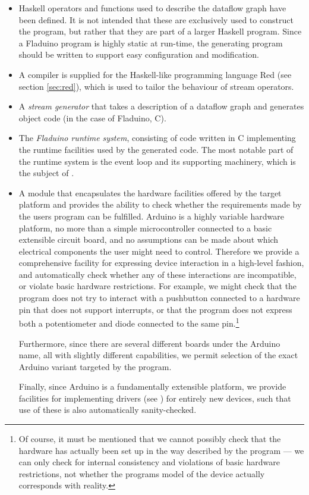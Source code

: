 \documentclass[a4paper, oneside, final]{memoir}
\let\fref\undefined
\let\Fref\undefined
\begin{document}
\begin{itemize}
\item Haskell operators and functions used to describe the dataflow
  graph have been defined.  It is not intended that these are
  exclusively used to construct the program, but rather that they are
  part of a larger Haskell program.  Since a Fladuino program is
  highly static at run-time, the generating program should be written
  to support easy configuration and modification.
\item A compiler is supplied for the Haskell-like programming language
  Red (see section \ref{sec:red}), which is used to tailor the
  behaviour of stream operators.
\item A \textit{stream generator} that takes a description of a
  dataflow graph and generates object code (in the case of Fladuino,
  C).
\item The \textit{Fladuino runtime system}, consisting of code written
  in C implementing the runtime facilities used by the generated code.
  The most notable part of the runtime system is the event loop and
  its supporting machinery, which is the subject of
  \Fref{sec:dataflowevaluationstrategy}.
\item A module that encapsulates the hardware facilities offered by
  the target platform and provides the ability to check whether the
  requirements made by the users program can be fulfilled.  Arduino is
  a highly variable hardware platform, no more than a simple
  microcontroller connected to a basic extensible circuit board, and
  no assumptions can be made about which electrical components the
  user might need to control.  Therefore we provide a comprehensive
  facility for expressing device interaction in a high-level fashion,
  and automatically check whether any of these interactions are
  incompatible, or violate basic hardware restrictions.  For example,
  we might check that the program does not try to interact with a
  pushbutton connected to a hardware pin that does not support
  interrupts, or that the program does not express both a
  potentiometer and diode connected to the same pin.\footnote{Of
    course, it must be mentioned that we cannot possibly check that
    the hardware has actually been set up in the way described by the
    program --- we can only check for internal consistency and
    violations of basic hardware restrictions, not whether the
    programs model of the device actually corresponds with reality.}

  Furthermore, since there are several different boards under the
  Arduino name, all with slightly different capabilities, we permit
  selection of the exact Arduino variant targeted by the program.

  Finally, since Arduino is a fundamentally extensible platform, we provide
  facilities for implementing drivers (see \fref{sec:user-extens-abstr}) for
  entirely new devices, such that use of these is also automatically
  sanity-checked.
\end{itemize}
\end{document}
